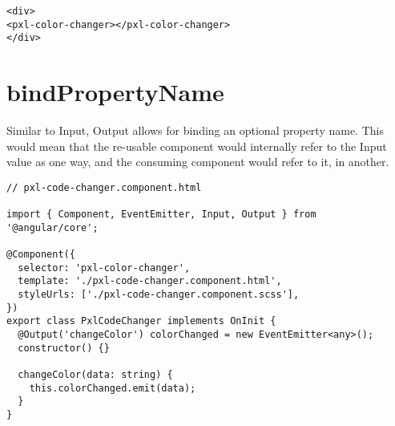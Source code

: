 \begin{lstlisting}
<div>
<pxl-color-changer></pxl-color-changer>
</div>
\end{lstlisting}

\section{ bindPropertyName }
Similar to Input, Output allows for binding an optional property name. This
would mean that the re-usable component would internally refer to the Input
value as one way, and the consuming component would refer to it, in another.

\begin{lstlisting}
// pxl-code-changer.component.html

import { Component, EventEmitter, Input, Output } from '@angular/core';

@Component({
  selector: 'pxl-color-changer',
  template: './pxl-code-changer.component.html',
  styleUrls: ['./pxl-code-changer.component.scss'],
})
export class PxlCodeChanger implements OnInit {
  @Output('changeColor') colorChanged = new EventEmitter<any>();
  constructor() {}

  changeColor(data: string) {
    this.colorChanged.emit(data);
  }
}
\end{lstlisting}
